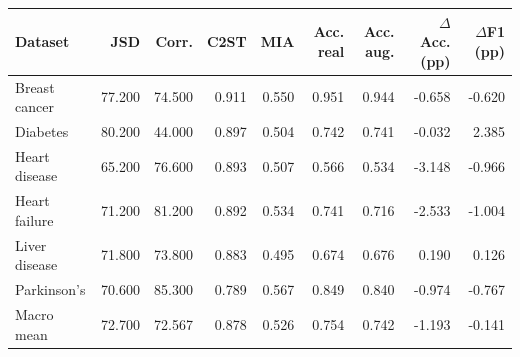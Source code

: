 \begin{tabular}{lrrrrrrrr}
\toprule
Dataset & JSD & Corr. & C2ST & MIA & Acc. real & Acc. aug. & $\Delta$Acc. (pp) & $\Delta$F1 (pp) \\
\midrule
Breast cancer & 77.200 & 74.500 & 0.911 & 0.550 & 0.951 & 0.944 & -0.658 & -0.620 \\
Diabetes & 80.200 & 44.000 & 0.897 & 0.504 & 0.742 & 0.741 & -0.032 & 2.385 \\
Heart disease & 65.200 & 76.600 & 0.893 & 0.507 & 0.566 & 0.534 & -3.148 & -0.966 \\
Heart failure & 71.200 & 81.200 & 0.892 & 0.534 & 0.741 & 0.716 & -2.533 & -1.004 \\
Liver disease & 71.800 & 73.800 & 0.883 & 0.495 & 0.674 & 0.676 & 0.190 & 0.126 \\
Parkinson's & 70.600 & 85.300 & 0.789 & 0.567 & 0.849 & 0.840 & -0.974 & -0.767 \\
Macro mean & 72.700 & 72.567 & 0.878 & 0.526 & 0.754 & 0.742 & -1.193 & -0.141 \\
\bottomrule
\end{tabular}
